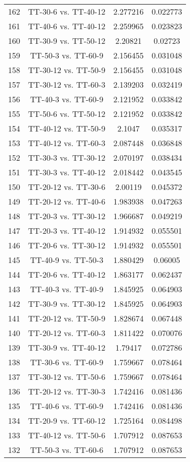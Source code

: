 \documentclass[a4paper,10pt]{article}
\begin{document}
\begin{landscape}
\begin{table}[!htp]
\begin{tabular}{cccc}
162&TT-30-6 vs. TT-40-12&2.277216&0.022773\\
161&TT-40-6 vs. TT-40-12&2.259965&0.023823\\
160&TT-30-9 vs. TT-50-12&2.20821&0.02723\\
159&TT-50-3 vs. TT-60-9&2.156455&0.031048\\
158&TT-30-12 vs. TT-50-9&2.156455&0.031048\\
157&TT-30-12 vs. TT-60-3&2.139203&0.032419\\
156&TT-40-3 vs. TT-60-9&2.121952&0.033842\\
155&TT-50-6 vs. TT-50-12&2.121952&0.033842\\
154&TT-40-12 vs. TT-50-9&2.1047&0.035317\\
153&TT-40-12 vs. TT-60-3&2.087448&0.036848\\
152&TT-30-3 vs. TT-30-12&2.070197&0.038434\\
151&TT-30-3 vs. TT-40-12&2.018442&0.043545\\
150&TT-20-12 vs. TT-30-6&2.00119&0.045372\\
149&TT-20-12 vs. TT-40-6&1.983938&0.047263\\
148&TT-20-3 vs. TT-30-12&1.966687&0.049219\\
147&TT-20-3 vs. TT-40-12&1.914932&0.055501\\
146&TT-20-6 vs. TT-30-12&1.914932&0.055501\\
145&TT-40-9 vs. TT-50-3&1.880429&0.06005\\
144&TT-20-6 vs. TT-40-12&1.863177&0.062437\\
143&TT-40-3 vs. TT-40-9&1.845925&0.064903\\
142&TT-30-9 vs. TT-30-12&1.845925&0.064903\\
141&TT-20-12 vs. TT-50-9&1.828674&0.067448\\
140&TT-20-12 vs. TT-60-3&1.811422&0.070076\\
139&TT-30-9 vs. TT-40-12&1.79417&0.072786\\
138&TT-30-6 vs. TT-60-9&1.759667&0.078464\\
137&TT-30-12 vs. TT-50-6&1.759667&0.078464\\
136&TT-20-12 vs. TT-30-3&1.742416&0.081436\\
135&TT-40-6 vs. TT-60-9&1.742416&0.081436\\
134&TT-20-9 vs. TT-60-12&1.725164&0.084498\\
133&TT-40-12 vs. TT-50-6&1.707912&0.087653\\
132&TT-50-3 vs. TT-60-6&1.707912&0.087653\\

\end{tabular}
\end{table}
\end{landscape}
\end{document}
